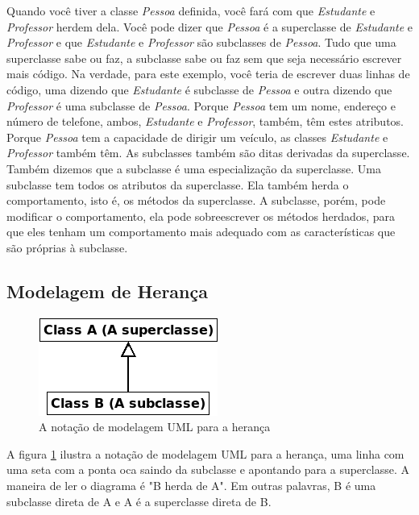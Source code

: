 Quando você tiver a classe \emph{Pessoa} definida, você fará com que \emph{Estudante} e \emph{Professor} herdem dela. Você pode dizer que \emph{Pessoa} é a superclasse de \emph{Estudante} e \emph{Professor} e que \emph{Estudante} e \emph{Professor} são subclasses de \emph{Pessoa}. Tudo que uma superclasse sabe ou faz, a subclasse sabe ou faz sem que seja necessário escrever mais código. Na verdade, para este exemplo, você teria de escrever duas linhas de código, uma dizendo que \emph{Estudante} é subclasse de \emph{Pessoa} e outra dizendo que \emph{Professor} é uma subclasse de \emph{Pessoa}. Porque \emph{Pessoa} tem um nome, endereço e número de telefone, ambos, \emph{Estudante} e \emph{Professor}, também, têm estes atributos. Porque \emph{Pessoa} tem a capacidade de dirigir um veículo, as classes \emph{Estudante} e \emph{Professor} também têm. As subclasses também são ditas derivadas da superclasse. Também dizemos que a subclasse é uma especialização da superclasse. Uma subclasse tem todos os atributos da superclasse. Ela também herda o comportamento, isto é, os métodos da superclasse. A subclasse, porém, pode modificar o comportamento, ela pode sobreescrever os métodos herdados, para que eles tenham um comportamento mais adequado com as características que são próprias à subclasse.

\subsection{Modelagem de Herança}

\begin{figure}
\begin{center}
\includegraphics[scale=0.8]{uml1.png} 
\caption{A notação de modelagem UML para a herança} \label{fig:uml1}
\end{center}
\end{figure}

A figura \ref{fig:uml1} ilustra a notação de modelagem UML para a herança, uma linha com uma seta com a ponta oca saindo da subclasse e apontando para a superclasse. A maneira de ler o diagrama é "B herda de A". Em outras palavras, B é uma subclasse direta de A e A é a superclasse direta de B.

